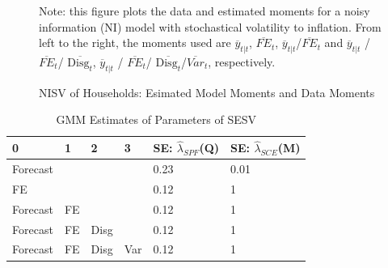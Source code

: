 \documentclass[]{article}
\begin{document}
\begin{figure}[ht]
\begin{subfigure}[b]{\textwidth}
	\end{subfigure}
	\begin{flushleft}
		{\footnotesize Note: this figure plots the data and estimated moments for a noisy information (NI) model  with stochastical volatility to inflation. From left to the right, the moments used are $\overline y_{t|t}$, $\overline{FE}_{t}$, $\overline y_{t|t}$/$\overline{FE}_{t}$ and $\overline y_{t|t}$ / $\overline{FE}_{t}$/ $\overline{\textrm{Disg}_t}$, $\overline y_{t|t}$ / $\overline{FE}_{t}$/ $\overline{\textrm{Disg}_t}$/$\overline{Var}_t$,  respectively. }
	\end{flushleft}
	\caption{NISV of Households: Esimated Model Moments and Data Moments}
\end{figure}


\begin{table}
	\centering
	\caption{GMM Estimates of Parameters of SESV}
	\label{GMM_Est_SE_SV_Table}
	\begin{tabular}{llllll}
		\hline 
		0        & 1  & 2    & 3   & SE: $\hat\lambda_{SPF}$(Q) & SE: $\hat\lambda_{SCE}$(M) \\
		\hline 
		Forecast &    &      &     & 0.23                       & 0.01                       \\
		FE       &    &      &     & 0.12                       & 1                          \\
		Forecast & FE &      &     & 0.12                       & 1                          \\
		Forecast & FE & Disg &     & 0.12                       & 1                          \\
		Forecast & FE & Disg & Var & 0.12                       & 1           \\
		\hline               
	\end{tabular}
\end{table}
\end{document}
